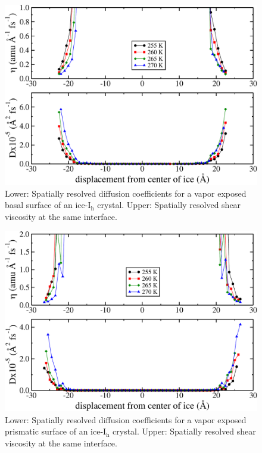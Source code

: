 \begin{figure}
\includegraphics[width=\linewidth]{Figures/basal_2DEta}
\caption{\label{fig:basal_DEta} Lower: Spatially resolved diffusion
  coefficients for a vapor exposed basal surface of an
  ice-I$_\mathrm{h}$ crystal. Upper: Spatially resolved shear viscosity
  at the same interface.}
\end{figure}                

\begin{figure}
\includegraphics[width=\linewidth]{Figures/prism_2DEta}
\caption{\label{fig:prism_DEta} Lower: Spatially resolved diffusion
  coefficients for a vapor exposed prismatic surface of an
  ice-I$_\mathrm{h}$ crystal. Upper: Spatially resolved shear viscosity
  at the same interface.}
\end{figure}                

